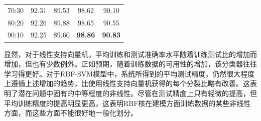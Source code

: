 \begin{table}[h]
\begin{tabular}{c|cc|cc}
70:30                                & {\color[HTML]{333333} 92.31} & {\color[HTML]{333333} 89.53} & {\color[HTML]{333333} 98.62}          & {\color[HTML]{333333} 90.10}          \\
80:20                                & {\color[HTML]{333333} 92.26} & {\color[HTML]{333333} 89.88} & {\color[HTML]{333333} 98.65}          & {\color[HTML]{333333} 90.55}          \\
90:10                                & {\color[HTML]{333333} 92.25} & {\color[HTML]{333333} 89.60} & {\color[HTML]{333333} \textbf{98.86}} & {\color[HTML]{333333} \textbf{90.83}} \\ \hline
\end{tabular}
\end{table}

显然，对于线性支持向量机，平均训练和测试准确率水平随着训练测试比的增加而增加，但也有少数例外。正如预期，随着训练数据的可用性的增加，该分类器往往学习得更好。对于RBF-SVM模型中，系统所得到的平均测试精度，仍然很大程度上遵循上述增加的趋势，比使用线性支持向量机获得的每个分裂比略有改善。这表明了潜在问题中固有的中等程度的非线性。尽管在测试精度上只有轻微的提高，但平均训练精度的提高明显更高，这表明RBF核在建模方面训练数据的某些非线性方面，而这些方面不能很好地一般化划分。

